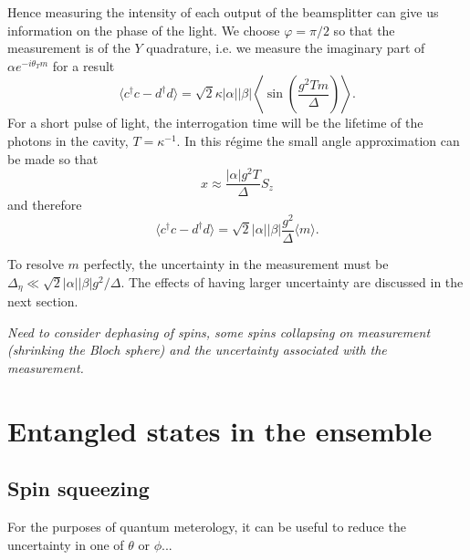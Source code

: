 Hence measuring the intensity of each output of the beamsplitter can give us
information on the phase of the light. We choose $\varphi = \pi/2$ so that the
measurement is of the $Y$ quadrature, i.e. we measure the imaginary part of
$\alpha e^{-i\theta_Tm}$ for a result
%
\begin{equation}
  \langle c^\dagger c - d^\dagger d\rangle = \sqrt{2}\kappa |\alpha||\beta|\left\langle\sin(\frac{g^2 T
  m}{\Delta})\right\rangle.
\end{equation}
%
For a short pulse of light, the interrogation time will be the lifetime of the
photons in the cavity, $T = \kappa^{-1}$. In this r\'egime the small angle
approximation can be made so that
%
\begin{equation}
  x \approx \frac{|\alpha|g^2 T}{\Delta}S_z
  \label{eqn:xapprox}
\end{equation}
%
and therefore
%
\begin{equation}
  \langle c^\dagger c - d^\dagger d\rangle = \sqrt{2}|\alpha||\beta|
  \frac{g^2}{\Delta}\langle m\rangle.
  \label{eqn:homomeas}
\end{equation}

To resolve $m$ perfectly, the uncertainty in the measurement must be
$\Delta_\eta \ll \sqrt{2}|\alpha||\beta|g^2/\Delta$. 
%
%
The effects of having larger uncertainty are discussed in the next section.

\emph{
Need to consider dephasing of spins, some spins collapsing on measurement
(shrinking the Bloch sphere) and the uncertainty associated with the
measurement.
}

\section{Entangled states in the ensemble}


\subsection{Spin squeezing}


For the purposes of quantum meterology, it can be useful to reduce the
uncertainty in one of $\theta$ or $\phi$...

